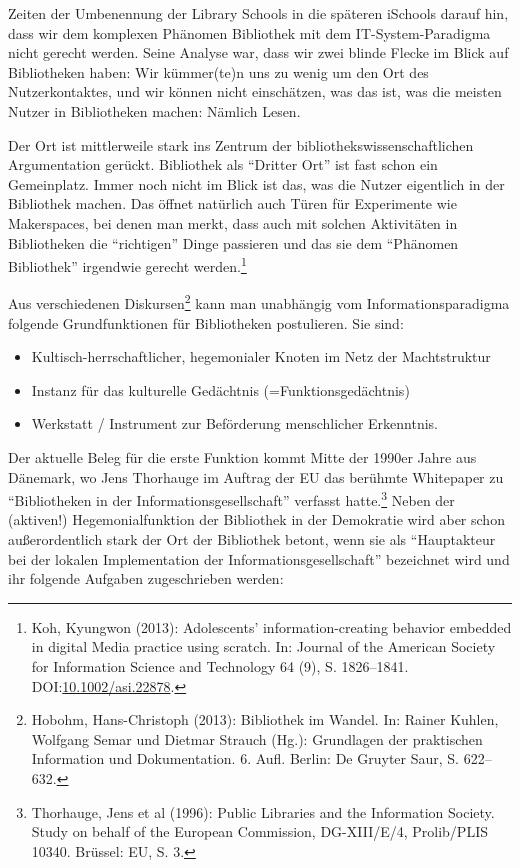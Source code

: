 Zeiten der Umbenennung der Library Schools in die späteren iSchools
darauf hin, dass wir dem komplexen Phänomen Bibliothek mit dem
IT-System-Paradigma nicht gerecht werden. Seine Analyse war, dass wir
zwei blinde Flecke im Blick auf Bibliotheken haben: Wir kümmer(te)n uns
zu wenig um den Ort des Nutzerkontaktes, und wir können nicht
einschätzen, was das ist, was die meisten Nutzer in Bibliotheken machen:
Nämlich Lesen.

Der Ort ist mittlerweile stark ins Zentrum der
bibliothekswissenschaftlichen Argumentation gerückt. Bibliothek als
\enquote{Dritter Ort} ist fast schon ein Gemeinplatz. Immer noch nicht
im Blick ist das, was die Nutzer eigentlich in der Bibliothek machen.
Das öffnet natürlich auch Türen für Experimente wie Makerspaces, bei
denen man merkt, dass auch mit solchen Aktivitäten in Bibliotheken die
\enquote{richtigen} Dinge passieren und das sie dem \enquote{Phänomen
Bibliothek} irgendwie gerecht werden.\footnote{Koh, Kyungwon (2013):
  Adolescents' information-creating behavior embedded in digital Media
  practice using scratch. In: Journal of the American Society for
  Information Science and Technology 64 (9), S. 1826--1841. DOI:\href{http://doi.org/10.1002/asi.22878}
  {10.1002/asi.22878}.}

Aus verschiedenen Diskursen\footnote{Hobohm, Hans-Christoph (2013):
  Bibliothek im Wandel. In: Rainer Kuhlen, Wolfgang Semar und Dietmar
  Strauch (Hg.): Grundlagen der praktischen Information und
  Dokumentation. 6. Aufl. Berlin: De Gruyter Saur, S. 622--632.} kann
man unabhängig vom Informationsparadigma folgende Grundfunktionen für
Bibliotheken postulieren. Sie sind:

\begin{flushleft}
\begin{itemize}
\item
  Kultisch-herrschaftlicher, hegemonialer Knoten im Netz der
  Machtstruktur
\item
  Instanz für das kulturelle Gedächtnis (=Funktionsgedächtnis)
\item
  Werkstatt / Instrument zur Beförderung menschlicher Erkenntnis.
\end{itemize}
\end{flushleft}

Der aktuelle Beleg für die erste Funktion kommt Mitte der 1990er Jahre
aus Dänemark, wo Jens Thorhauge im Auftrag der EU das berühmte
Whitepaper zu \enquote{Bibliotheken in der Informationsgesellschaft}
verfasst hatte.\footnote{Thorhauge, Jens et al (1996): Public Libraries
  and the Information Society. Study on behalf of the European
  Commission, DG-XIII/E/4, Prolib/PLIS 10340. Brüssel: EU, S. 3.} Neben
der (aktiven!) Hegemonialfunktion der Bibliothek in der Demokratie wird
aber schon außerordentlich stark der Ort der Bibliothek betont, wenn sie
als \enquote{Hauptakteur bei der lokalen Implementation der
Informationsgesellschaft} bezeichnet wird und ihr folgende Aufgaben
zugeschrieben werden:

